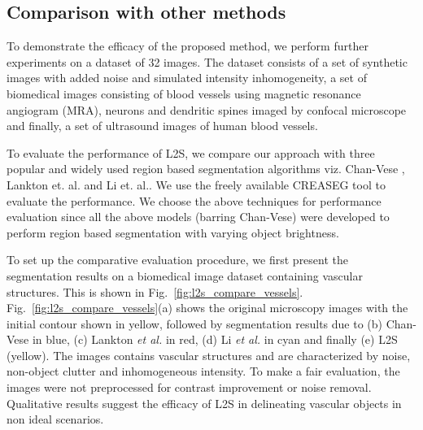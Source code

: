 \clearpage
\subsection{Comparison with other methods}
To demonstrate the efficacy of the proposed method, we perform further experiments on a dataset of 32 images. The dataset consists of a set of synthetic images with added noise and simulated intensity inhomogeneity, a set of biomedical images consisting of blood vessels using magnetic resonance angiogram (MRA), neurons and dendritic spines imaged by confocal microscope and finally, a set of ultrasound images of human blood vessels.  

To evaluate the performance of L2S, we compare our approach with three popular and widely used region based segmentation algorithms viz. Chan-Vese \cite{chan_vese}, Lankton et. al. \cite{lankton_localCV} and Li et. al.\cite{li_region_scalable}. We use the freely available CREASEG\cite{creaseg} tool to evaluate the performance. We choose the above techniques for performance evaluation since all the above models (barring Chan-Vese) were developed to perform region based segmentation with varying object brightness.

To set up the comparative evaluation procedure, we first present the segmentation results on a biomedical image dataset containing vascular structures. This is shown in Fig.~\ref{fig:l2s_compare_vessels}. Fig.~\ref{fig:l2s_compare_vessels}(a) shows the original microscopy images with the initial contour shown in yellow, followed by segmentation results due to (b) Chan-Vese in blue, (c) Lankton \textit{et al.} in red, (d) Li \textit{et al.} in cyan and finally (e) L2S (yellow). The images contains vascular structures and are characterized by  noise, non-object clutter and inhomogeneous intensity. To make a fair evaluation, the images were not preprocessed for contrast improvement or noise removal. Qualitative results suggest the efficacy of L2S in delineating vascular objects in non ideal scenarios.

